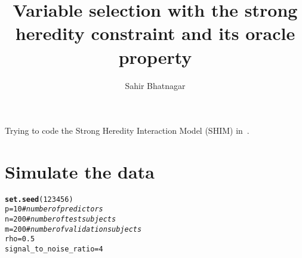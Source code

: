 \documentclass[11pt,letter]{article}\usepackage[]{graphicx}\usepackage[]{color}
\makeatletter
\newcommand{\hlnum}[1]{\textcolor[rgb]{0.686,0.059,0.569}{#1}}%
\newcommand{\hlcom}[1]{\textcolor[rgb]{0.678,0.584,0.686}{\textit{#1}}}%
\newcommand{\hlstd}[1]{\textcolor[rgb]{0.345,0.345,0.345}{#1}}%
\newcommand{\hlkwb}[1]{\textcolor[rgb]{0.69,0.353,0.396}{#1}}%
\newcommand{\hlkwd}[1]{\textcolor[rgb]{0.737,0.353,0.396}{\textbf{#1}}}%
\newenvironment{kframe}{%
 \def\at@end@of@kframe{}%
 \ifinner\ifhmode%
  \def\at@end@of@kframe{\end{minipage}}%
  \begin{minipage}{\columnwidth}%
 \fi\fi%
 \def\FrameCommand##1{\hskip\@totalleftmargin \hskip-\fboxsep
 \colorbox{shadecolor}{##1}\hskip-\fboxsep
     \hskip-\linewidth \hskip-\@totalleftmargin \hskip\columnwidth}%
 \MakeFramed {\advance\hsize-\width
   \@totalleftmargin\z@ \linewidth\hsize
   \@setminipage}}%
 {\par\unskip\endMakeFramed%
 \at@end@of@kframe}
\newenvironment{knitrout}{}{} %
\makeatother
\begin{document}
\pagestyle{fancy}

\title{Variable selection with the strong heredity constraint and its oracle property}
\author{Sahir Bhatnagar}
\maketitle






Trying to code the Strong Heredity Interaction Model (SHIM) in~\cite{choi2010variable}.

\section{Simulate the data}

\begin{knitrout}
\color{fgcolor}\begin{kframe}
\begin{alltt}
\hlkwd{set.seed}\hlstd{(}\hlnum{123456}\hlstd{)}
\hlstd{p} \hlkwb{=} \hlnum{10}  \hlcom{# number of predictors}
\hlstd{n} \hlkwb{=} \hlnum{200}  \hlcom{# number of test subjects}
\hlstd{m} \hlkwb{=} \hlnum{200}  \hlcom{# number of validation subjects}
\hlstd{rho} \hlkwb{=} \hlnum{0.5}
\hlstd{signal_to_noise_ratio} \hlkwb{=} \hlnum{4}


\end{alltt}
\end{kframe}
\end{knitrout}
\end{document}
